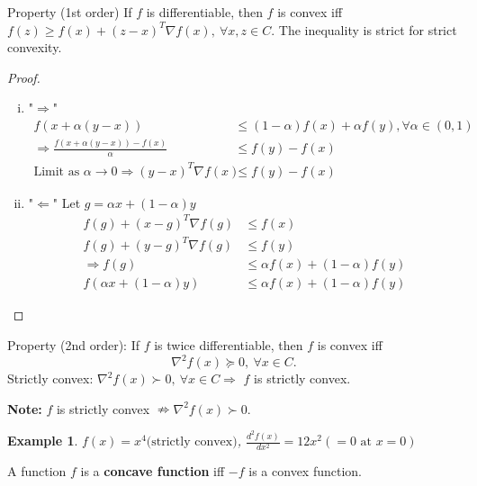 \documentclass[11pt,a4paper]{article}
\newtheorem{example}{Example}
\begin{document}
Property (1st order) If $f$ is differentiable, then $f$ is convex iff $f(z) \geq f(x)+(z-x)^{T} \nabla f(x), \ \forall x, z \in C .$ The inequality is strict for strict convexity.
\begin{proof}
\quad\\
\begin{enumerate}[(i)]
    \item "$\Rightarrow$" \begin{equation}
        \begin{aligned}
            f(x+\alpha (y-x))&\leq (1-\alpha)f(x)+\alpha f(y), \forall \alpha \in (0,1)\\
            \Rightarrow	\frac{f(x+\alpha(y-x))-f(x)}{\alpha}&\leq f(y)-f(x)\\
            \text{Limit as }\alpha \rightarrow 0 \Rightarrow (y-x)^{T} \nabla f(x)&\leq f(y)-f(x)
        \end{aligned}
        \nonumber
    \end{equation}
    \item "$\Leftarrow$" Let $g=\alpha x+(1-\alpha) y$
    \begin{equation}
        \begin{aligned}
            f(g)+(x-g)^{T} \nabla f(g)&\leq f(x)\\
            f(g)+(y-g)^{T} \nabla f(g)&\leq f(y)\\
            \Rightarrow	f(g)&\leq \alpha f(x)+(1-\alpha)f(y)\\
            f(\alpha x+(1-\alpha) y)&\leq \alpha f(x)+(1-\alpha)f(y)
        \end{aligned}
        \nonumber
    \end{equation}
\end{enumerate}
\end{proof}

Property (2nd order): If $f$ is twice differentiable, then $f$ is convex iff
$$
\nabla^{2} f(x) \succeq 0,\ \forall x \in C .
$$
Strictly convex: $\nabla^{2} f(x) \succ 0,\ \forall x \in C \Rightarrow	$ $f$ is strictly convex.

\textbf{Note:} $f$ is strictly convex $\nRightarrow \nabla^{2} f(x) \succ 0$.
\begin{example}
$f(x)=x^4\text{(strictly convex)}$, $\frac{d^2f(x)}{dx^2}=12x^2(=0\text{ at }x=0)$
\end{example}

A function $f$ is a \textbf{concave function} iff $-f$ is a convex function.
\end{document}

